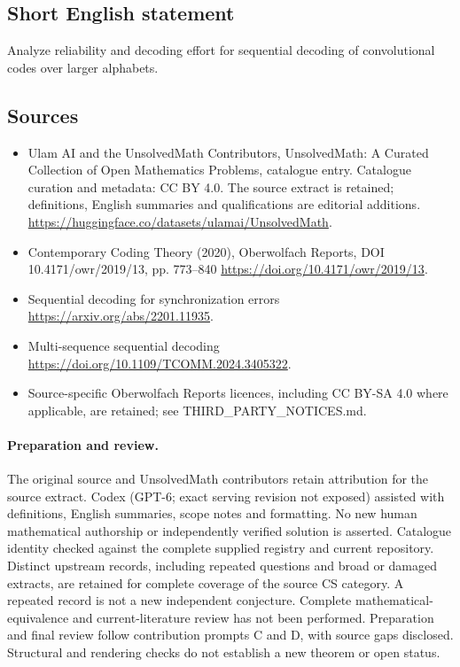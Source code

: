 \documentclass[11pt]{article}
\begin{document}
\subsection{Short English statement}
Analyze reliability and decoding effort for sequential decoding of convolutional codes over larger alphabets.
\subsection{Sources}
\begin{itemize}
\item[\hypertarget{source:statement:1}{S1}] Ulam AI and the UnsolvedMath Contributors, UnsolvedMath: A Curated Collection of Open Mathematics Problems, catalogue entry. Catalogue curation and metadata: CC BY 4.0. The source extract is retained; definitions, English summaries and qualifications are editorial additions.
\url{https://huggingface.co/datasets/ulamai/UnsolvedMath}.
\item[\hypertarget{source:statement:2}{S2}] Contemporary Coding Theory (2020), Oberwolfach Reports, DOI 10.4171/owr/2019/13, pp. 773--840
\url{https://doi.org/10.4171/owr/2019/13}.
\item[\hypertarget{source:statement:3}{S3}] Sequential decoding for synchronization errors
\url{https://arxiv.org/abs/2201.11935}.
\item[\hypertarget{source:statement:4}{S4}] Multi-sequence sequential decoding
\url{https://doi.org/10.1109/TCOMM.2024.3405322}.
\item Source-specific Oberwolfach Reports licences, including CC BY-SA 4.0 where applicable, are retained; see THIRD\_PARTY\_NOTICES.md.
\end{itemize}
\paragraph{Preparation and review.}
The original source and UnsolvedMath contributors retain attribution for the source extract. Codex (GPT-6; exact serving revision not exposed) assisted with definitions, English summaries, scope notes and formatting. No new human mathematical authorship or independently verified solution is asserted. Catalogue identity checked against the complete supplied registry and current repository. Distinct upstream records, including repeated questions and broad or damaged extracts, are retained for complete coverage of the source CS category. A repeated record is not a new independent conjecture. Complete mathematical-equivalence and current-literature review has not been performed. Preparation and final review follow contribution prompts C and D, with source gaps disclosed. Structural and rendering checks do not establish a new theorem or open status.
\label{end:statement}
\end{document}
